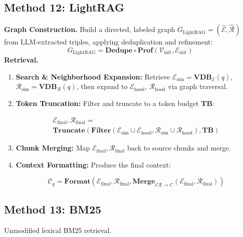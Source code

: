 \documentclass{article}
\theoremstyle{plain}
\theoremstyle{definition}
\theoremstyle{remark}
\begin{document}
\subsection{Method 12: LightRAG}
\textbf{Graph Construction.} Build a directed, labeled graph $G_{\text{LightRAG}}=(\hat{\mathcal{E}}, \hat{\mathcal{R}})$ from LLM-extracted triples, applying deduplication and refinement:
\begin{equation}
G_{\text{LightRAG}} = \mathbf{Dedupe}\circ\mathbf{Prof}(\mathcal{V}_{\text{init}}, \mathcal{E}_{\text{init}})
\end{equation}
\textbf{Retrieval.} 
\begin{enumerate}
    \item \textbf{Search \& Neighborhood Expansion:} Retrieve $\mathcal{E}_{\text{sim}} = \mathbf{VDB}_{\mathcal{E}}(q)$, $\mathcal{R}_{\text{sim}} = \mathbf{VDB}_{\mathcal{R}}(q)$, then expand to $\mathcal{E}_{\text{hood}}$, $\mathcal{R}_{\text{hood}}$ via graph traversal.
    \item \textbf{Token Truncation:} Filter and truncate to a token budget $\mathbf{TB}$:
    \begin{small}
    \begin{multline}
    \mathcal{E}_{\text{final}}, \mathcal{R}_{\text{final}} = \\ \mathbf{Truncate}(\mathbf{Filter}(\mathcal{E}_{\text{sim}} \cup \mathcal{E}_{\text{hood}}, \mathcal{R}_{\text{sim}} \cup \mathcal{R}_{\text{hood}}), \mathbf{TB})
    \end{multline}
    \end{small}
    \item \textbf{Chunk Merging:} Map $\mathcal{E}_{\text{final}}, \mathcal{R}_{\text{final}}$ back to source chunks and merge.
    \item \textbf{Context Formatting:} Produce the final context:
    \begin{small}
    \begin{equation}
    \mathcal{C}_q = \mathbf{Format}(\mathcal{E}_{\text{final}}, \mathcal{R}_{\text{final}}, \mathbf{Merge}_{\mathcal{E}\mathcal{R} \to C}(\mathcal{E}_{\text{final}}, \mathcal{R}_{\text{final}}))
    \end{equation}
    \end{small}
\end{enumerate}

\subsection{Method 13: BM25}
Unmodified lexical BM25 retrieval.
\end{document}
